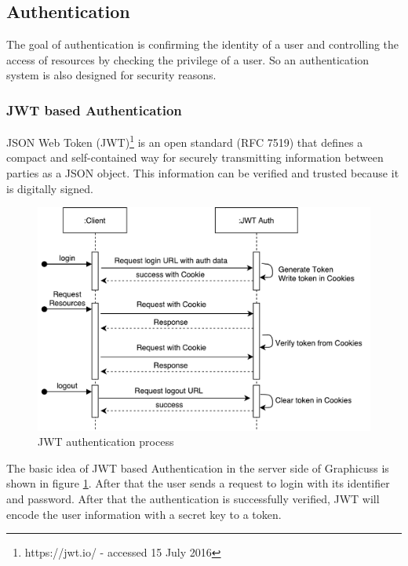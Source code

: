 \subsection{Authentication}
The goal of authentication is confirming the identity of a user and controlling the access of resources by checking the privilege of a user. So an authentication system is also designed for security reasons.

\subsubsection{JWT based Authentication}
JSON Web Token (JWT)\footnote{https://jwt.io/ - accessed 15 July 2016} is an open standard (RFC 7519) that defines a compact and self-contained way for securely transmitting information between parties as a JSON object. This information can be verified and trusted because it is digitally signed.


\begin{figure}[!htbp]
  \centering
    \includegraphics[width=1\textwidth]{Figures/imp-jwt-process.pdf}
  \caption{JWT authentication process}
  \label{fig:jwt-process-imp}
\end{figure}


The basic idea of JWT based Authentication in the server side of Graphicuss is shown in figure \ref{fig:jwt-process-imp}. After that the user sends a request to login with its identifier and password. After that the authentication is successfully verified, JWT will encode the user information with a secret key to a token.

